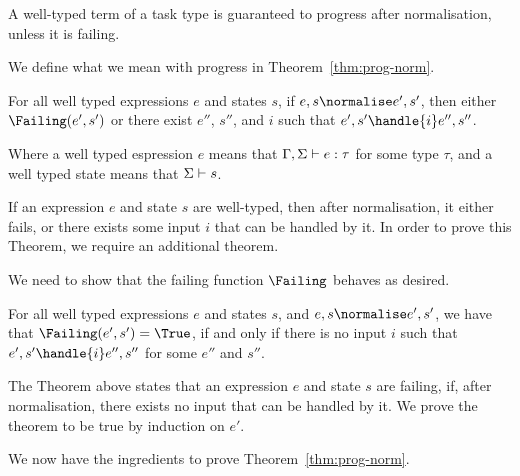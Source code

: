 A well-typed term of a task type is guaranteed to progress after normalisation,
unless it is failing.

We define what we mean with progress in Theorem~\ref{thm:prog-norm}.
\begin{theorem}
  For all well typed expressions $e$ and states $s$,
  if $e,s \normalise e',s'$,
  then either $\Failing(e', s')$
  or there exist $e''$, $s''$, and $i$ such that $e',s'\handle{i} e'',s''$.
  \label{thm:prog-norm}
\end{theorem}

Where a well typed espression $e$ means that $\Gamma,\Sigma\vdash e:\tau$ for
some type $\tau$, and a well typed state means that $\Sigma\vdash s$.

If an expression $e$ and state $s$ are well-typed, then after normalisation, it
either fails, or there exists some input $i$ that can be handled by it.
In order to prove this Theorem, we require an additional theorem.


We need to show that the failing function $\Failing$ behaves as desired.

\begin{theorem}
  For all well typed expressions $e$ and states $s$,
  and $e,s \normalise e',s'$,
  we have that $\Failing(e',s') = \True$,
  if and only if there is no input $i$
  such that $e',s'\handle{i} e'',s''$ for some $e''$ and $s''$.
  \label{thm:failing}
\end{theorem}

The Theorem above states that an expression $e$ and state $s$ are failing, if,
after normalisation, there exists no input that can be handled by it.
We prove the theorem to be true by induction on $e'$.


We now have the ingredients to prove Theorem~\ref{thm:prog-norm}.


